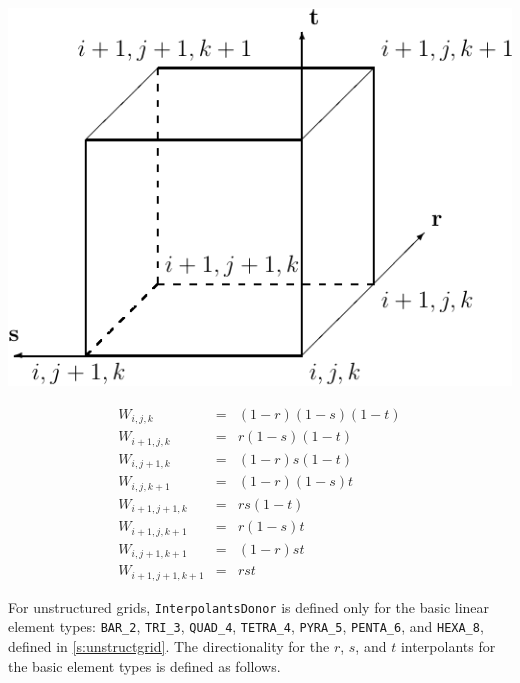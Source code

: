 {\centering%
\begin{minipage}[t]{0.55\linewidth}
   \centering
   \vspace{0pt}
   \includegraphics{cnct.figs/cnct_struct}
\end{minipage}%
\begin{minipage}[t]{0.45\linewidth}
   \vspace{-\abovedisplayskip}
   \begin{eqnarray*}
      W_{i,  j,  k  } &=& (1-r)(1-s)(1-t) \\
      W_{i+1,j,  k  } &=& r(1-s)(1-t) \\
      W_{i,  j+1,k  } &=& (1-r)s(1-t) \\
      W_{i,  j,  k+1} &=& (1-r)(1-s)t \\
      W_{i+1,j+1,k  } &=& rs(1-t) \\
      W_{i+1,j,  k+1} &=& r(1-s)t \\
      W_{i,  j+1,k+1} &=& (1-r)st \\
      W_{i+1,j+1,k+1} &=& rst
   \end{eqnarray*}
\end{minipage}}
\vspace{\baselineskip}

For unstructured grids, \texttt{InterpolantsDonor} is defined only for
the basic linear element types:
\texttt{BAR\_2}, \texttt{TRI\_3}, \texttt{QUAD\_4}, \texttt{TETRA\_4},
\texttt{PYRA\_5}, \texttt{PENTA\_6}, and \texttt{HEXA\_8}, defined in
\autoref{s:unstructgrid}.
The directionality for the $r$, $s$, and $t$ interpolants for the basic
element types is defined as follows.

